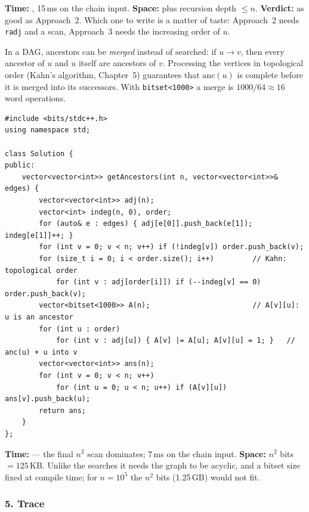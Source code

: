 \begin{alternativebox}
\begin{complexitybox}
\textbf{Time:} , 15\,ms on the chain input. \textbf{Space:}  plus recursion depth $\le n$. \textbf{Verdict:} as good as Approach~2. Which one to write is a matter of taste: Approach~2 needs \texttt{radj} and a scan, Approach~3 needs the increasing order of $u$.
\end{complexitybox}
\end{alternativebox}

\begin{tricksbox}
In a DAG, ancestors can be \emph{merged} instead of searched: if $u \to v$, then every ancestor of $u$ and $u$ itself are ancestors of $v$. Processing the vertices in topological order (Kahn's algorithm, Chapter~5) guarantees that $\mathrm{anc}(u)$ is complete before it is merged into its successors. With \texttt{bitset<1000>} a merge is $1000/64 \approx 16$ word operations.

\begin{lstlisting}[style=cpp]
#include <bits/stdc++.h>
using namespace std;

class Solution {
public:
    vector<vector<int>> getAncestors(int n, vector<vector<int>>& edges) {
        vector<vector<int>> adj(n);
        vector<int> indeg(n, 0), order;
        for (auto& e : edges) { adj[e[0]].push_back(e[1]); indeg[e[1]]++; }
        for (int v = 0; v < n; v++) if (!indeg[v]) order.push_back(v);
        for (size_t i = 0; i < order.size(); i++)         // Kahn: topological order
            for (int v : adj[order[i]]) if (--indeg[v] == 0) order.push_back(v);
        vector<bitset<1000>> A(n);                        // A[v][u]: u is an ancestor
        for (int u : order)
            for (int v : adj[u]) { A[v] |= A[u]; A[v][u] = 1; }   // anc(u) + u into v
        vector<vector<int>> ans(n);
        for (int v = 0; v < n; v++)
            for (int u = 0; u < n; u++) if (A[v][u]) ans[v].push_back(u);
        return ans;
    }
};
\end{lstlisting}
\textbf{Time:}  --- the final $n^2$ scan dominates; 7\,ms on the chain input. \textbf{Space:} $n^2$ bits $= 125$\,KB. Unlike the searches it needs the graph to be acyclic, and a bitset size fixed at compile time; for $n = 10^5$ the $n^2$ bits (1.25\,GB) would not fit.
\end{tricksbox}

\subsubsection*{5. Trace}


